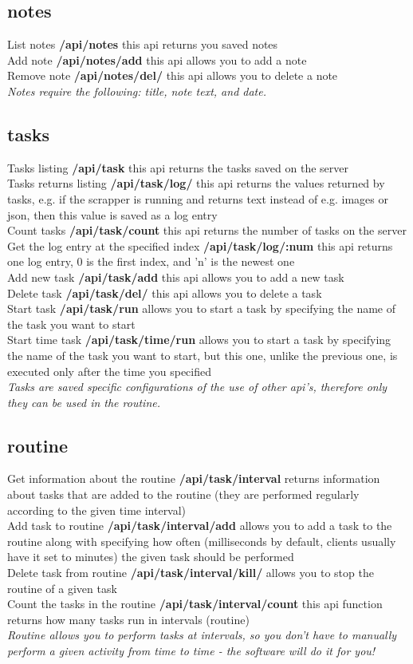 \documentclass{article}
\begin{document}
\subsection{notes}
List notes \textbf{/api/notes} this api returns you saved notes\\
Add note \textbf{/api/notes/add} this api allows you to add a note\\
Remove note \textbf{/api/notes/del/} this api allows you to delete a note\\
\textit{Notes require the following: title, note text, and date.}
\subsection{tasks}
Tasks listing \textbf{/api/task} this api returns the tasks saved on the server\\
Tasks returns listing \textbf{/api/task/log/} this api returns the values returned by tasks, e.g. if the scrapper is running and returns text instead of e.g. images or json, then this value is saved as a log entry\\
Count tasks \textbf{/api/task/count} this api returns the number of tasks on the server\\
Get the log entry at the specified index \textbf{/api/task/log/:num} this api returns one log entry, 0 is the first index, and 'n' is the newest one\\
Add new task \textbf{/api/task/add} this api allows you to add a new task\\
Delete task \textbf{/api/task/del/} this api allows you to delete a task\\
Start task \textbf{/api/task/run} allows you to start a task by specifying the name of the task you want to start\\
Start time task \textbf{/api/task/time/run} allows you to start a task by specifying the name of the task you want to start, but this one, unlike the previous one, is executed only after the time you specified\\
\textit{Tasks are saved specific configurations of the use of other api's, therefore only they can be used in the routine.}
\subsection{routine}
Get information about the routine \textbf{/api/task/interval} returns information about tasks that are added to the routine (they are performed regularly according to the given time interval)\\
Add task to routine \textbf{/api/task/interval/add} allows you to add a task to the routine along with specifying how often (milliseconds by default, clients usually have it set to minutes) the given task should be performed\\
Delete task from routine \textbf{/api/task/interval/kill/} allows you to stop the routine of a given task\\
Count the tasks in the routine \textbf{/api/task/interval/count} this api function returns how many tasks run in intervals (routine)\\
\textit{Routine allows you to perform tasks at intervals, so you don't have to manually perform a given activity from time to time - the software will do it for you!}
\end{document}
